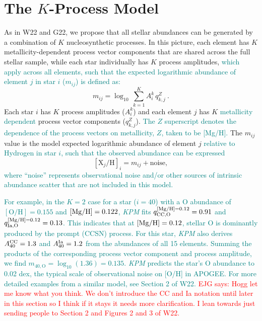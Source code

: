 \documentclass[modern]{aastex631}
\newcommand{\mgh}{[{\rm Mg}/{\rm H}]}
\newcommand{\ejg}[1]{\textcolor{red}{EJG says: #1}}
\newcommand{\add}[1]{\textcolor{teal}{#1}}
\newcommand{\name}{\textsl{KPM}}
\begin{document}
\section{The $K$-Process Model}\label{sec:model}

As in W22 and G22, we propose that all stellar abundances can be generated by a combination of $K$ nucleosynthetic processes.
In this picture, each element has $K$ metallicity-dependent process vector components that are shared across the full stellar sample, while each star individually has $K$ process amplitudes, \add{which apply across all elements, such that the expected logarithmic abundance of element $j$ in star $i$ ($m_{ij}$) is defined as:}
\begin{equation}\label{eq:mij_k}
    m_{ij} = \log_{10} \, \sum^K_{k=1} A_i^k \, q_{k,j}^Z ~.
\end{equation}
Each star $i$ has $K$ process amplitudes ($A^k_i$)
and each element $j$ has $K$ \add{metallicity dependent} process vector components ($q_{k,j}^{Z}$). 
\add{The $Z$ superscript denotes the dependence of the process vectors on metallicity, $Z$, taken to be [Mg/H].}
The $m_{ij}$ value is the model expected logarithmic abundance of element $j$ \add{relative to Hydrogen in star $i$, such that the observed abundance can be expressed}
\begin{equation}\label{eq:xh}
    [\text{X}_j/\text{H}]_i = m_{ij} + \text{noise},
\end{equation}
\add{where ``noise'' represents observational noise and/or other sources of intrinsic abundance scatter that are not included in this model.}

\add{For example, in the $K=2$ case for a star ($i=40$) with a O abundance of $[\text{O}/\text{H}] =0.155$ and $\mgh = 0.122$, \name{} fits $q_{\text{CC,O}}^{\mgh=0.12} = 0.91$ and $q_{\text{Ia,O}}^{\mgh=0.12} = 0.13$. This indicates that at $\mgh = 0.12$, stellar O is dominantly produced by the prompt (CCSN) process. For this star, \name{} also derives $A_{40}^{\rm CC} = 1.3$ and $A_{40}^{\rm Ia} = 1.2$ from the abundances of all 15 elements. Summing the products of the corresponding process vector component and process amplitude, we find $m_{40,\text{O}} = \log_{10} ( 1.36 ) = 0.135$. \name{} predicts the star's O abundance to 0.02 dex, the typical scale of observational noise on [O/H] in APOGEE. For more detailed examples from a similar model, see Section 2 of W22.}
\ejg{Hogg let me know what you think. We don't introduce the CC and Ia notation until later in this section so I think if it stays it needs more clarification. I lean towards just sending people to Section 2 and Figures 2 and 3 of W22. }
\end{document}
